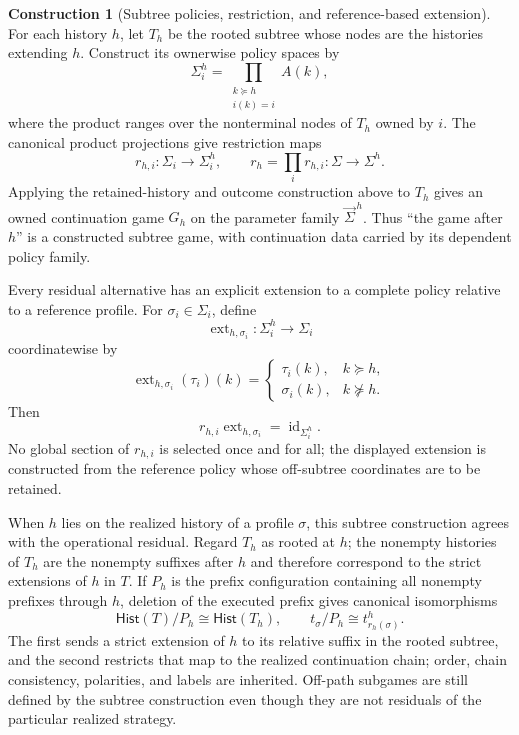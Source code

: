 \documentclass[11pt,a4paper]{article}
\numberwithin{equation}{section}
\theoremstyle{definition}
\newtheorem{construction}[construction]{Construction}
\theoremstyle{remark}
\theoremstyle{plain}
\begin{document}
\begin{construction}[Subtree policies, restriction, and reference-based extension]
For each history $h$, let $T_h$ be the rooted subtree whose nodes are the
histories extending $h$. Construct its ownerwise policy spaces by
\[
 \Sigma_i^h
 =\prod_{\substack{k\succeq h\\ i(k)=i}}A(k),
\]
where the product ranges over the nonterminal nodes of $T_h$ owned by $i$.
The canonical product projections give restriction maps
\[
 r_{h,i}:\Sigma_i\longrightarrow\Sigma_i^h,
 \qquad
 r_h=\prod_i r_{h,i}:\Sigma\longrightarrow\Sigma^h.
\]
Applying the retained-history and outcome construction above to $T_h$ gives
an owned continuation game $G_h$ on the parameter family
$\vec\Sigma^{\,h}$. Thus ``the game after $h$'' is a constructed subtree
game, with continuation data carried by its dependent policy family.

Every residual alternative has an explicit extension to a complete policy
relative to a reference profile. For $\sigma_i\in\Sigma_i$, define
\[
 \operatorname{ext}_{h,\sigma_i}:\Sigma_i^h\longrightarrow\Sigma_i
\]
coordinatewise by
\[
 \operatorname{ext}_{h,\sigma_i}(\tau_i)(k)=
 \begin{cases}
  \tau_i(k),&k\succeq h,\\
  \sigma_i(k),&k\not\succeq h.
 \end{cases}
\]
Then
\[
 r_{h,i}\operatorname{ext}_{h,\sigma_i}
 =\operatorname{id}_{\Sigma_i^h}.
\]
No global section of $r_{h,i}$ is selected once and for all; the displayed
extension is constructed from the reference policy whose off-subtree
coordinates are to be retained.

When $h$ lies on the realized history of a profile $\sigma$, this subtree
construction agrees with the operational residual. Regard $T_h$ as rooted at
$h$; the nonempty histories of $T_h$ are the nonempty suffixes after $h$ and
therefore correspond to the strict extensions of $h$ in $T$. If $P_h$ is the
prefix configuration containing all nonempty prefixes through $h$, deletion
of the executed prefix gives canonical isomorphisms
\[
 \mathsf{Hist}(T)/P_h\cong\mathsf{Hist}(T_h),
 \qquad
 t_\sigma/P_h\cong t^h_{r_h(\sigma)}.
\]
The first sends a strict extension of $h$ to its relative suffix in the rooted
subtree, and the second restricts that map to the realized continuation chain;
order, chain consistency, polarities, and labels are inherited. Off-path
subgames are still defined by the subtree construction even though they are
not residuals of the particular realized strategy.
\end{construction}
\end{document}
